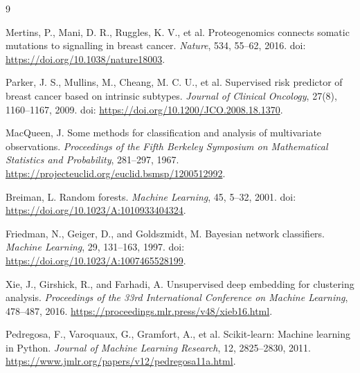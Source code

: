 \renewcommand{\refname}{参考文献}

\begin{thebibliography}{9}

Mertins, P., Mani, D. R., Ruggles, K. V., et al.
Proteogenomics connects somatic mutations to signalling in breast cancer.
\textit{Nature}, 534, 55--62, 2016.
doi: \url{https://doi.org/10.1038/nature18003}.

Parker, J. S., Mullins, M., Cheang, M. C. U., et al.
Supervised risk predictor of breast cancer based on intrinsic subtypes.
\textit{Journal of Clinical Oncology}, 27(8), 1160--1167, 2009.
doi: \url{https://doi.org/10.1200/JCO.2008.18.1370}.

MacQueen, J.
Some methods for classification and analysis of multivariate observations.
\textit{Proceedings of the Fifth Berkeley Symposium on Mathematical Statistics and Probability}, 281--297, 1967.
\url{https://projecteuclid.org/euclid.bsmsp/1200512992}.

Breiman, L.
Random forests.
\textit{Machine Learning}, 45, 5--32, 2001.
doi: \url{https://doi.org/10.1023/A:1010933404324}.

Friedman, N., Geiger, D., and Goldszmidt, M.
Bayesian network classifiers.
\textit{Machine Learning}, 29, 131--163, 1997.
doi: \url{https://doi.org/10.1023/A:1007465528199}.

Xie, J., Girshick, R., and Farhadi, A.
Unsupervised deep embedding for clustering analysis.
\textit{Proceedings of the 33rd International Conference on Machine Learning}, 478--487, 2016.
\url{https://proceedings.mlr.press/v48/xieb16.html}.

Pedregosa, F., Varoquaux, G., Gramfort, A., et al.
Scikit-learn: Machine learning in Python.
\textit{Journal of Machine Learning Research}, 12, 2825--2830, 2011.
\url{https://www.jmlr.org/papers/v12/pedregosa11a.html}.

\end{thebibliography}
